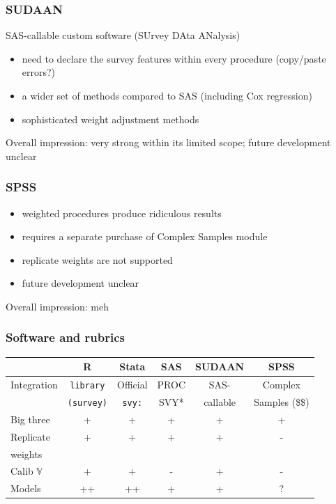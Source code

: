 \documentclass{beamer}
\begin{document}
\begin{frame}\frametitle{SUDAAN}


SAS-callable custom software (SUrvey DAta ANalysis)

\begin{itemize}
    \item need to declare the survey features within every procedure (copy/paste errors?)
    \item a wider set of methods compared to SAS (including Cox regression)
    \item sophisticated weight adjustment methods
\end{itemize}

\bigskip

Overall impression: very strong within its limited scope; future development unclear

\end{frame}

\begin{frame}\frametitle{SPSS}


\begin{itemize}
    \item weighted procedures produce ridiculous results
    \item requires a separate purchase of Complex Samples module
    \item replicate weights are not supported
    \item future development unclear
\end{itemize}

\vspace{1in}

Overall impression: meh

\end{frame}

\begin{frame}\frametitle{Software and rubrics}

\noindent
\begin{tabular}{l|ccccc}
    & R
        & Stata
            & SAS
                & SUDAAN
                    & SPSS \\
\hline
Integration
    & \texttt{library}
        & Official
            & PROC
                & SAS-
                    & Complex \\
    & \texttt{(survey)}
        & \texttt{svy:}
            & SVY*
                & callable
                    & Samples (\$\$) \\
Big three & + & + & + & + & + \\
Replicate & + & + & + & + & - \\
weights & \\
Calib $\mathbb{V}$
    & + & + & - & + & - \\
Models & ++ & ++ & + & + & ? \\
\end{tabular}

\end{frame}
\end{document}
